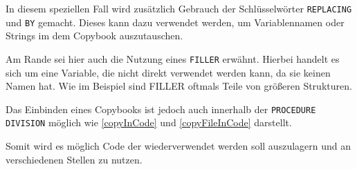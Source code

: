 In diesem speziellen Fall wird zusätzlich Gebrauch der Schlüsselwörter \texttt{REPLACING} und \texttt{BY} gemacht. Dieses kann dazu verwendet werden, um Variablennamen oder Strings im dem Copybook auszutauschen.

Am Rande sei hier auch die Nutzung eines \texttt{FILLER} erwähnt. Hierbei handelt es sich um eine Variable, die nicht direkt verwendet werden kann, da sie keinen Namen hat. Wie im Beispiel sind FILLER oftmals Teile von größeren Strukturen.

Das Einbinden eines Copybooks ist jedoch auch innerhalb der \texttt{PROCEDURE DIVISION} möglich wie \autoref{copyInCode} und \autoref{copyFileInCode} darstellt.

Somit wird es möglich Code der wiederverwendet werden soll auszulagern und an verschiedenen Stellen zu nutzen.
